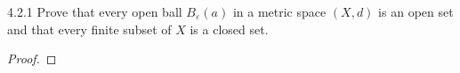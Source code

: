 \begin{problem}{4.2.1}
  Prove that every open ball $B_\varepsilon(a)$ in a metric space $(X, d)$ is an open set
  and that every finite subset of $X$ is a closed set.
\end{problem}

\begin{proof}
\end{proof}
\newpage

